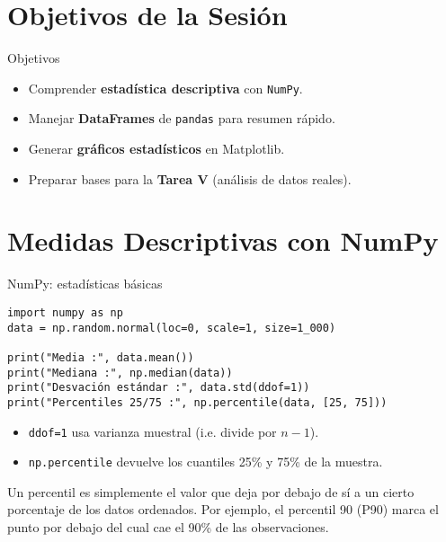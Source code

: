 \documentclass[10pt]{beamer}
\begin{document}
\section{Objetivos de la Sesión}
\begin{frame}{Objetivos}
  \begin{itemize}
    \item Comprender \textbf{estadística descriptiva} con \texttt{NumPy}.
    \item Manejar \textbf{DataFrames} de \texttt{pandas} para resumen rápido.
    \item Generar \textbf{gráficos estadísticos} en Matplotlib.
    \item Preparar bases para la \textbf{Tarea V} (análisis de datos reales).
  \end{itemize}
\end{frame}

\section{Medidas Descriptivas con NumPy}
\begin{frame}[fragile]{NumPy: estadísticas básicas}
\begin{verbatim}
import numpy as np
data = np.random.normal(loc=0, scale=1, size=1_000)

print("Media :", data.mean())
print("Mediana :", np.median(data))
print("Desvación estándar :", data.std(ddof=1))
print("Percentiles 25/75 :", np.percentile(data, [25, 75]))
\end{verbatim}
\begin{itemize}
  \item \texttt{ddof=1} usa varianza muestral (i.e. divide por \(n-1\)).
  \item \texttt{np.percentile} devuelve los cuantiles 25\% y 75\% de la muestra.
\end{itemize}
\tiny{Un percentil es simplemente el valor que deja por debajo de sí a un cierto porcentaje de los datos ordenados.
Por ejemplo, el percentil 90 (P90) marca el punto por debajo del cual cae el 90\% de las observaciones.
}
\end{frame}

\end{document}
